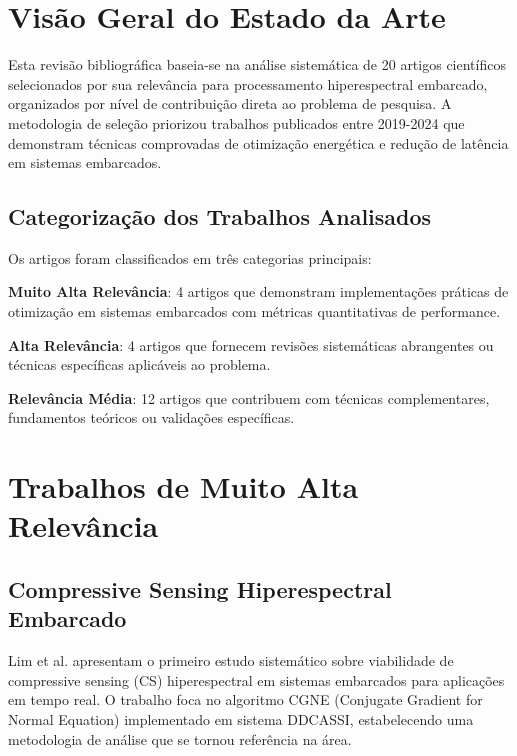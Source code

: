 
\section{Visão Geral do Estado da Arte}

Esta revisão bibliográfica baseia-se na análise sistemática de 20 artigos científicos selecionados por sua relevância para processamento hiperespectral embarcado, organizados por nível de contribuição direta ao problema de pesquisa. A metodologia de seleção priorizou trabalhos publicados entre 2019-2024 que demonstram técnicas comprovadas de otimização energética e redução de latência em sistemas embarcados.

\subsection{Categorização dos Trabalhos Analisados}

Os artigos foram classificados em três categorias principais:

\textbf{Muito Alta Relevância}: 4 artigos que demonstram implementações práticas de otimização em sistemas embarcados com métricas quantitativas de performance.

\textbf{Alta Relevância}: 4 artigos que fornecem revisões sistemáticas abrangentes ou técnicas específicas aplicáveis ao problema.

\textbf{Relevância Média}: 12 artigos que contribuem com técnicas complementares, fundamentos teóricos ou validações específicas.

\section{Trabalhos de Muito Alta Relevância}

\subsection{Compressive Sensing Hiperespectral Embarcado}

Lim et al. \cite{lim2022} apresentam o primeiro estudo sistemático sobre viabilidade de compressive sensing (CS) hiperespectral em sistemas embarcados para aplicações em tempo real. O trabalho foca no algoritmo CGNE (Conjugate Gradient for Normal Equation) implementado em sistema DDCASSI, estabelecendo uma metodologia de análise que se tornou referência na área.

